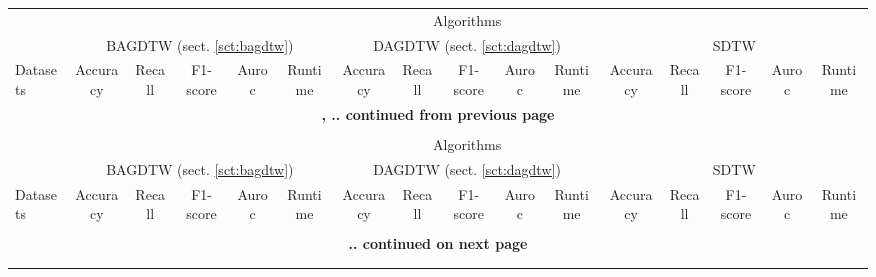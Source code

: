 {\tiny
	\begin{longtable}{|l|ccccc|ccccc|ccccc|}

		\hline
		& \multicolumn{15}{c|}{Algorithms} \\
		& \multicolumn{5}{c|}{BAGDTW (sect. \ref{sct:bagdtw})} & \multicolumn{5}{c|}{DAGDTW (sect. \ref{sct:dagdtw})} & \multicolumn{5}{c|}{SDTW \cite{cuturi2017soft}} \\
		Datasets & Accuracy & Recall & F1-score & Auroc & Runtime & Accuracy & Recall & F1-score & Auroc & Runtime & Accuracy & Recall & F1-score & Auroc & Runtime \\
		\hline
		\endfirsthead

		\multicolumn{16}{c}{\bfseries \tablename \thetable{}, .. continued from previous page} \\
		\multicolumn{16}{c}{} \\
		\hline
		& \multicolumn{15}{c|}{Algorithms} \\
		& \multicolumn{5}{c|}{BAGDTW (sect. \ref{sct:bagdtw})} & \multicolumn{5}{c|}{DAGDTW (sect. \ref{sct:dagdtw})} & \multicolumn{5}{c|}{SDTW \cite{cuturi2017soft}} \\
		Datasets & Accuracy & Recall & F1-score & Auroc & Runtime & Accuracy & Recall & F1-score & Auroc & Runtime & Accuracy & Recall & F1-score & Auroc & Runtime \\
		\hline
		\endhead

		\multicolumn{16}{c}{} \\
		\multicolumn{16}{c}{\bfseries  .. continued on next page} \\
		\endfoot

		\multicolumn{16}{c}{} \\
		\endlastfoot


\end{longtable}}
